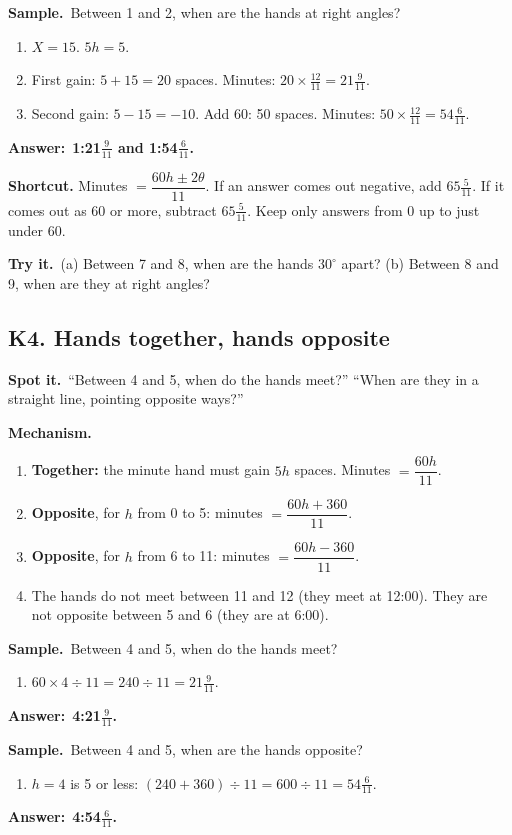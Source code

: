 \documentclass[11pt,a4paper]{article}
\let\oldsubsection\subsection
\renewcommand{\subsection}{\needspace{9\baselineskip}\oldsubsection}
\newcommand{\spot}{\textbf{\color{ember}Spot it.}\ }
\newcommand{\mech}{\textbf{\color{ember}Mechanism.}\ }
\newif\ifkeepsamp
\newcommand{\ans}[1]{\par\nopagebreak\noindent\textbf{\color{ember}Answer:}\ \textbf{#1}\par}
\newcommand{\samp}{\ifkeepsamp\needspace{4\baselineskip}\fi\textbf{\color{ember}Sample.}\ }
\newcommand{\tryit}[1]{\textbf{\color{ember}Try it.}\ #1}
\begin{document}
\samp Between 1 and 2, when are the hands at right angles?
\begin{enumerate}
\item $X = 15$. $5h = 5$.
\item First gain: $5 + 15 = 20$ spaces. Minutes: $20 \times \tfrac{12}{11} = 21\tfrac9{11}$.
\item Second gain: $5 - 15 = -10$. Add 60: 50 spaces. Minutes: $50 \times \tfrac{12}{11} = 54\tfrac6{11}$.
\end{enumerate}
\ans{1:21$\tfrac9{11}$ and 1:54$\tfrac6{11}$.}

\textbf{Shortcut.} Minutes $= \dfrac{60h \pm 2\theta}{11}$. If an answer comes out negative, add $65\tfrac5{11}$. If it comes out as 60 or more, subtract $65\tfrac5{11}$. Keep only answers from 0 up to just under 60.

\tryit (a) Between 7 and 8, when are the hands $30^\circ$ apart? (b) Between 8 and 9, when are they at right angles?

\subsection{K4. Hands together, hands opposite}
\spot ``Between 4 and 5, when do the hands meet?'' ``When are they in a straight line, pointing opposite ways?''

\mech
\begin{enumerate}
\item \textbf{Together:} the minute hand must gain $5h$ spaces. Minutes $= \dfrac{60h}{11}$.
\item \textbf{Opposite}, for $h$ from 0 to 5: minutes $= \dfrac{60h + 360}{11}$.
\item \textbf{Opposite}, for $h$ from 6 to 11: minutes $= \dfrac{60h - 360}{11}$.
\item The hands do not meet between 11 and 12 (they meet at 12:00). They are not opposite between 5 and 6 (they are at 6:00).
\end{enumerate}

\samp Between 4 and 5, when do the hands meet?
\begin{enumerate}
\item $60 \times 4 \div 11 = 240 \div 11 = 21\tfrac9{11}$.
\end{enumerate}
\ans{4:21$\tfrac9{11}$.}

\samp Between 4 and 5, when are the hands opposite?
\begin{enumerate}
\item $h = 4$ is 5 or less: $(240 + 360) \div 11 = 600 \div 11 = 54\tfrac6{11}$.
\end{enumerate}
\ans{4:54$\tfrac6{11}$.}
\end{document}
